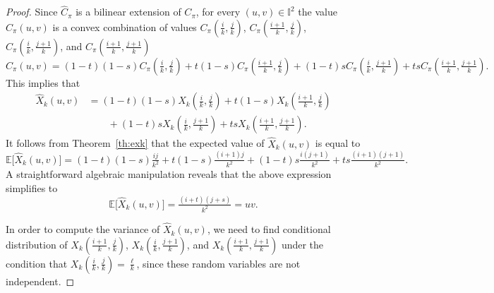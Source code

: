 \documentclass[12pt,a4paper]{amsart}
\theoremstyle{definition}
\newcommand{\II}{\mathbb{I}}
\newcommand{\Chat}{\widehat{C}}
\newcommand{\Xhat}{\widehat{X}}
\newcommand{\EE}{\mathbb{E}}
\begin{document}
\begin{proof}
Since $\Chat_\pi$ is a bilinear extension of $C_\pi$, for every $(u,v) \in \II^2$ the value $\Chat_\pi(u,v)$ is a convex combination of values $C_\pi(\tfrac{i}{k},\tfrac{j}{k})$, $C_\pi(\tfrac{i+1}{k},\tfrac{j}{k})$, $C_\pi(\tfrac{i}{k},\tfrac{j+1}{k})$, and $C_\pi(\tfrac{i+1}{k},\tfrac{j+1}{k})$
$$\Chat_\pi(u,v) = (1-t)(1-s)C_\pi(\tfrac{i}{k},\tfrac{j}{k}) + t(1-s)C_\pi(\tfrac{i+1}{k},\tfrac{j}{k}) + (1-t)sC_\pi(\tfrac{i}{k},\tfrac{j+1}{k}) +tsC_\pi(\tfrac{i+1}{k},\tfrac{j+1}{k}).$$
This implies that
\begin{align*}
    \Xhat_k(u,v) &= (1-t)(1-s)X_k(\tfrac{i}{k},\tfrac{j}{k}) + t(1-s)X_k(\tfrac{i+1}{k},\tfrac{j}{k}) \\
    & \qquad + (1-t)sX_k(\tfrac{i}{k},\tfrac{j+1}{k}) +tsX_k(\tfrac{i+1}{k},\tfrac{j+1}{k}).
\end{align*}
It follows from Theorem~\ref{th:exk} that the expected value of $\Xhat_k(u,v)$ is equal to
$$ \EE\big[\Xhat_k(u,v)\big] = (1-t)(1-s)\tfrac{ij}{k^2} + t(1-s)\tfrac{(i+1)j}{k^2} + (1-t)s\tfrac{i(j+1)}{k^2} +ts\tfrac{(i+1)(j+1)}{k^2}. $$
A straightforward algebraic manipulation reveals that the above expression simplifies to
$$ \EE\big[\Xhat_k(u,v)\big] =  \tfrac{(i+t)(j+s)}{k^2} = uv. $$

In order to compute the variance of $\Xhat_k(u,v)$, we need to find conditional distribution of  $X_k(\tfrac{i+1}{k},\tfrac{j}{k})$, $X_k(\tfrac{i}{k},\tfrac{j+1}{k})$, and $X_k(\tfrac{i+1}{k},\tfrac{j+1}{k})$ under the condition that $X_k(\tfrac{i}{k},\tfrac{j}{k}) = \tfrac{\ell}{k}$, since these random variables are not independent. 


\end{proof}
\end{document}
